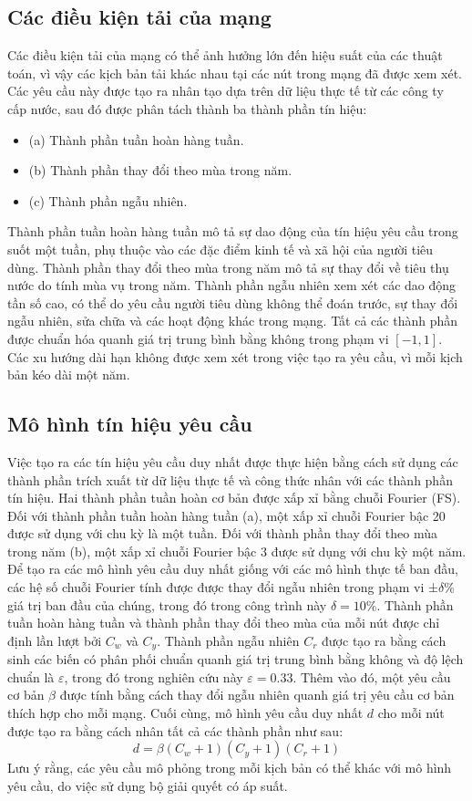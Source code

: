 \subsection{Các điều kiện tải của mạng}

Các điều kiện tải của mạng có thể ảnh hưởng lớn đến hiệu suất của các thuật toán, vì vậy các kịch bản tải khác nhau tại các nút trong mạng đã được xem xét. Các yêu cầu này được tạo ra nhân tạo dựa trên dữ liệu thực tế từ các công ty cấp nước, sau đó được phân tách thành ba thành phần tín hiệu: 
\begin{itemize}
    \item (a) Thành phần tuần hoàn hàng tuần.
    \item (b) Thành phần thay đổi theo mùa trong năm.
    \item (c) Thành phần ngẫu nhiên.
\end{itemize}
Thành phần tuần hoàn hàng tuần mô tả sự dao động của tín hiệu yêu cầu trong suốt một tuần, phụ thuộc vào các đặc điểm kinh tế và xã hội của người tiêu dùng. Thành phần thay đổi theo mùa trong năm mô tả sự thay đổi về tiêu thụ nước do tính mùa vụ trong năm. Thành phần ngẫu nhiên xem xét các dao động tần số cao, có thể do yêu cầu người tiêu dùng không thể đoán trước, sự thay đổi ngẫu nhiên, sửa chữa và các hoạt động khác trong mạng. Tất cả các thành phần được chuẩn hóa quanh giá trị trung bình bằng không trong phạm vi $[-1, 1]$. Các xu hướng dài hạn không được xem xét trong việc tạo ra yêu cầu, vì mỗi kịch bản kéo dài một năm.

\subsection{Mô hình tín hiệu yêu cầu}

Việc tạo ra các tín hiệu yêu cầu duy nhất được thực hiện bằng cách sử dụng các thành phần trích xuất từ dữ liệu thực tế và công thức nhân với các thành phần tín hiệu. Hai thành phần tuần hoàn cơ bản được xấp xỉ bằng chuỗi Fourier (FS). Đối với thành phần tuần hoàn hàng tuần (a), một xấp xỉ chuỗi Fourier bậc 20 được sử dụng với chu kỳ là một tuần. Đối với thành phần thay đổi theo mùa trong năm (b), một xấp xỉ chuỗi Fourier bậc 3 được sử dụng với chu kỳ một năm. Để tạo ra các mô hình yêu cầu duy nhất giống với các mô hình thực tế ban đầu, các hệ số chuỗi Fourier tính được được thay đổi ngẫu nhiên trong phạm vi ±$\delta$\% giá trị ban đầu của chúng, trong đó trong công trình này $\delta = 10\%$. Thành phần tuần hoàn hàng tuần và thành phần thay đổi theo mùa của mỗi nút được chỉ định lần lượt bởi $C_w$ và $C_y$. Thành phần ngẫu nhiên $C_r$ được tạo ra bằng cách sinh các biến có phân phối chuẩn quanh giá trị trung bình bằng không và độ lệch chuẩn là $\varepsilon$, trong đó trong nghiên cứu này $\varepsilon = 0.33$. Thêm vào đó, một yêu cầu cơ bản $\beta$ được tính bằng cách thay đổi ngẫu nhiên quanh giá trị yêu cầu cơ bản thích hợp cho mỗi mạng. Cuối cùng, mô hình yêu cầu duy nhất $d$ cho mỗi nút được tạo ra bằng cách nhân tất cả các thành phần như sau: 
$$
d = \beta (C_w + 1)(C_y + 1)(C_r + 1)
$$
Lưu ý rằng, các yêu cầu mô phỏng trong mỗi kịch bản có thể khác với mô hình yêu cầu, do việc sử dụng bộ giải quyết có áp suất.

